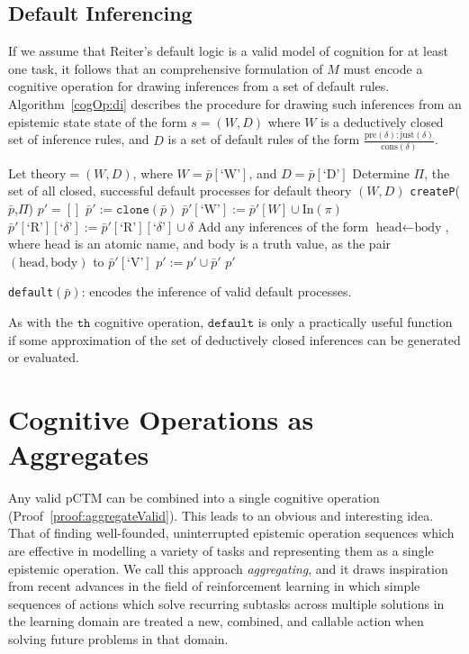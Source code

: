 \subsection{Default Inferencing}
If we assume that Reiter's default logic is a valid model of cognition for at least one task, it follows that an comprehensive formulation of $M$ must encode a cognitive operation for drawing inferences from a set of default rules. Algorithm~\ref{cogOp:di} describes the procedure for drawing such inferences from an epistemic state state of the form $s=(W,D)$ where $W$ is a deductively closed set of inference rules, and $D$ is a set of default rules of the form $\frac{\text{pre}(\delta):\text{just}(\delta)}{\text{cons}(\delta)}$.

\begin{algorithm}[H] 
\SetAlgoLined
{}
{
Let $\textrm{theory}=(W,D)$, where $W=\bar{p}[\text{`W'}]$, and $D=\bar{p}[\textrm{`D'}]$\;
Determine $\Pi$, the set of all closed, successful default processes for default theory $(W,D)$\;
\Return \texttt{createP}($\bar{p}$,$\Pi$)
}
{
$p'=[]$
\For{$\pi \in \Pi$}
{
$\bar{p}':=\texttt{clone}(\bar{p})$\;
$\bar{p}'[\textrm{`W'}]:=\bar{p}'[W]\cup \text{In}(\pi)$\;
$\bar{p}'[\textrm{`R'}][\textrm{`}\delta\textrm{'}]:=\bar{p}'[\textrm{`R'}][\textrm{`}\delta\textrm{'}]\cup \delta$\;
Add any inferences of the form $\text{head}\leftarrow \text{body}$, where head is an atomic name, and body is a truth value, as the pair $(\text{head},\text{body})$ to $\bar{p}'[\textrm{`V'}]$\;
$p':=p'\cup \bar{p}'$\;
\Return $p'$
}
}

\caption{\texttt{default}$(\bar{p})$: encodes the inference of valid default processes.}
\label{cogOp:di}
\end{algorithm}

As with the $\texttt{th}$ cognitive operation, $\texttt{default}$ is only a practically useful function if some approximation of the set of deductively closed inferences can be generated or evaluated.

\section{Cognitive Operations as Aggregates}
Any valid pCTM can be combined into a single cognitive operation (Proof~\ref{proof:aggregateValid}). This leads to an obvious and interesting idea. That of finding well-founded, uninterrupted epistemic operation sequences which are effective in modelling a variety of tasks and representing them as a single epistemic operation. We call this approach \textit{aggregating}, and it draws inspiration from recent advances in the field of reinforcement learning\citep{drummond2002accelerating} in which simple sequences of actions which solve recurring subtasks across multiple solutions in the learning domain are treated a new, combined, and callable action when solving future problems in that domain. 

